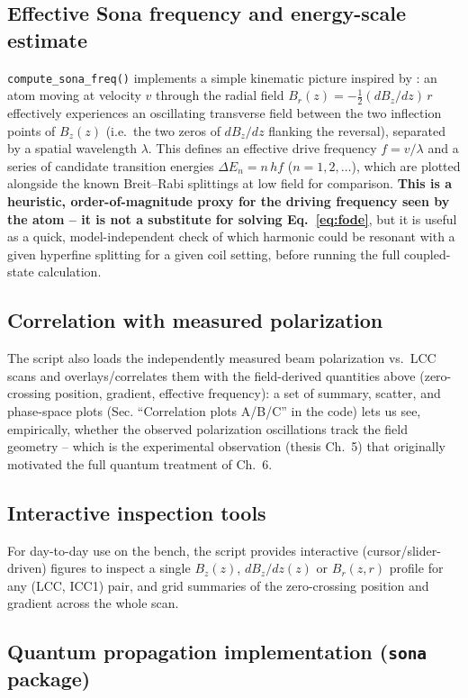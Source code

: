 \documentclass[11pt,a4paper]{article}
\begin{document}
\subsection{Effective Sona frequency and energy-scale estimate}
\texttt{compute\_sona\_freq()} implements a simple kinematic picture inspired
by \cite{kannis2023,engels2024}: an atom moving at velocity $v$ through the
radial field $B_r(z)=-\tfrac12(dB_z/dz)\,r$ effectively experiences an
oscillating transverse field between the two inflection points of $B_z(z)$
(i.e.\ the two zeros of $dB_z/dz$ flanking the reversal), separated by a
spatial wavelength $\lambda$. This defines an effective drive frequency
$f=v/\lambda$ and a series of candidate transition energies
$\Delta E_n = n\,h f$ ($n=1,2,\dots$), which are plotted alongside the known
Breit--Rabi splittings at low field for comparison. \textbf{This is a
heuristic, order-of-magnitude proxy for the driving frequency seen by the
atom -- it is not a substitute for solving Eq.~\eqref{eq:fode}}, but it is
useful as a quick, model-independent check of which harmonic could be
resonant with a given hyperfine splitting for a given coil setting, before
running the full coupled-state calculation.

\subsection{Correlation with measured polarization}
The script also loads the independently measured beam polarization vs.\ LCC
scans and overlays/correlates them with the field-derived quantities above
(zero-crossing position, gradient, effective frequency): a set of summary,
scatter, and phase-space plots (Sec. ``Correlation plots A/B/C'' in the
code) lets us see, empirically, whether the observed polarization
oscillations track the field geometry -- which is the experimental
observation (thesis Ch.~5) that originally motivated the full quantum
treatment of Ch.~6.

\subsection{Interactive inspection tools}
For day-to-day use on the bench, the script provides interactive
(cursor/slider-driven) figures to inspect a single $B_z(z)$, $dB_z/dz(z)$ or
$B_r(z,r)$ profile for any (LCC, ICC1) pair, and grid summaries of the
zero-crossing position and gradient across the whole scan.

\subsection{Quantum propagation implementation (\texttt{sona} package)}
\label{sec:quantum-implementation}
\end{document}
